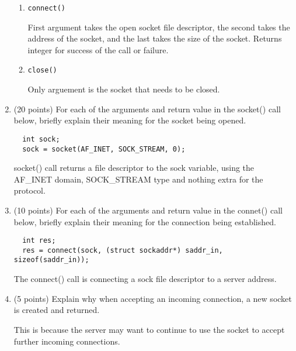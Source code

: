 \documentclass{article}[9pt]
\newenvironment{answerfont}{\fontfamily{qhv}\selectfont}{\par}
\newenvironment{myanswer}{\begin{mdframed}\begin{answerfont}}{\end{answerfont}\end{mdframed}}
\begin{document}
\begin{enumerate}
\begin{enumerate}
  \item \texttt{connect()}
    \begin{myanswer}
    First argument takes the open socket file descriptor, the second takes the address of the socket, and the last takes the size of the socket.
    Returns integer for success of the call or failure.
    \end{myanswer}

  \item \texttt{close()}
    \begin{myanswer}
    Only arguement is the socket that needs to be closed.
    \end{myanswer}
\end{enumerate}

\item (20 points) For each of the arguments and return value in the socket() call below, briefly explain their meaning for the socket being opened.
  \begin{enumerate}
  \begin{verbatim}
  int sock;
  sock = socket(AF_INET, SOCK_STREAM, 0);
  \end{verbatim}
  \end{enumerate}

  \begin{myanswer}
  socket() call returns a file descriptor to the sock variable, using the AF_INET domain, SOCK_STREAM type and nothing extra for the protocol.
  \end{myanswer}


\item (10 points) For each of the arguments and return value in the connet() call below, briefly explain their meaning for the connection being established.
  \begin{enumerate}
  \begin{verbatim}
  int res;
  res = connect(sock, (struct sockaddr*) saddr_in, sizeof(saddr_in));
  \end{verbatim}
  \end{enumerate}

  \begin{myanswer}
  The connect() call is connecting a sock file descriptor to a server address.
  \end{myanswer}


\item (5 points) Explain why when accepting an incoming connection, a new socket is created and returned.

  \begin{myanswer}
  This is because the server may want to continue to use the socket to accept further incoming connections.
  \end{myanswer}


\end{enumerate}
\end{document}
